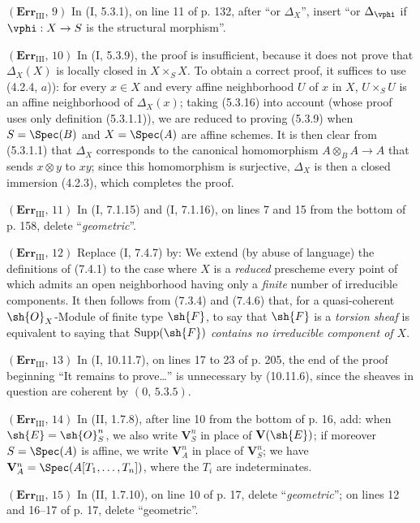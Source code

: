 \noindent\textbf{$(\mathbf{Err}_{\mathrm{III}},\,9)$} In (I, 5.3.1), on line
11 of p. 132, after ``or $\Delta_X$'', insert ``or $\Delta_\vphi$ if
$\vphi:X\to S$ is the structural morphism''.

\noindent\textbf{$(\mathbf{Err}_{\mathrm{III}},\,10)$} In (I, 5.3.9), the
proof is insufficient, because it does not prove that $\Delta_X(X)$ is
locally closed in $X\times_SX$. To obtain a correct proof, it suffices to use
(4.2.4, $a$)): for every $x\in X$ and every affine neighborhood $U$ of $x$ in
$X$, $U\times_SU$ is an affine neighborhood of $\Delta_X(x)$; taking (5.3.16)
into account (whose proof uses only definition (5.3.1.1)), we are reduced to
proving (5.3.9) when $S=\Spec(B)$ and $X=\Spec(A)$ are affine schemes. It is
then clear from (5.3.1.1) that $\Delta_X$ corresponds to the canonical
homomorphism $A\otimes_BA\to A$ that sends $x\otimes y$ to $xy$; since this
homomorphism is surjective, $\Delta_X$ is then a closed immersion (4.2.3),
which completes the proof.

\noindent\textbf{$(\mathbf{Err}_{\mathrm{III}},\,11)$} In (I, 7.1.15) and
(I, 7.1.16), on lines 7 and 15 from the bottom of p. 158, delete
``\emph{geometric}''.

\noindent\textbf{$(\mathbf{Err}_{\mathrm{III}},\,12)$} Replace (I, 7.4.7)
by: We extend (by abuse of language) the definitions of (7.4.1) to the case
where $X$ is a \emph{reduced} prescheme every point of which admits an open
neighborhood having only a \emph{finite} number of irreducible components. It
then follows from (7.3.4) and (7.4.6) that, for a quasi-coherent
$\sh{O}_X$-Module of finite type $\sh{F}$, to say that $\sh{F}$ is a
\emph{torsion sheaf} is equivalent to saying that $\operatorname{Supp}(\sh{F})$
\emph{contains no irreducible component of $X$}.

\noindent\textbf{$(\mathbf{Err}_{\mathrm{III}},\,13)$} In (I, 10.11.7), on
lines 17 to 23 of p. 205, the end of the proof beginning ``It remains to
prove\ldots{}'' is unnecessary by (10.11.6), since the sheaves in question
are coherent by $(0,\,5.3.5)$.

\noindent\textbf{$(\mathbf{Err}_{\mathrm{III}},\,14)$} In (II, 1.7.8), after
line 10 from the bottom of p. 16, add: when $\sh{E}=\sh{O}_S^n$, we also write
$\mathbf V_S^n$ in place of $\mathbf V(\sh{E})$; if moreover $S=\Spec(A)$ is
affine, we write $\mathbf V_A^n$ in place of $\mathbf V_S^n$; we have
$\mathbf V_A^n=\Spec(A[T_1,\ldots,T_n])$, where the $T_i$ are indeterminates.

\noindent\textbf{$(\mathbf{Err}_{\mathrm{III}},\,15)$} In (II, 1.7.10), on
line 10 of p. 17, delete ``\emph{geometric}''; on lines 12 and 16--17 of p.
17, delete ``geometric''.


